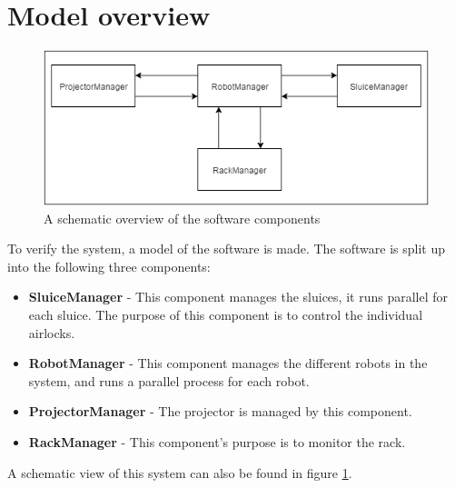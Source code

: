 \documentclass[12pt]{report}
\begin{document}
	\section{Model overview}
	\begin{figure}
		\centering
		\includegraphics[scale=0.7]{schematicoverview}
		\caption{A schematic overview of the software components}
		\label{fig:components}
	\end{figure}
	To verify the system, a model of the software is made. The software is split up into the following three components:
	\begin{itemize}
	\item \textbf{SluiceManager} - This component manages the sluices, it runs parallel for each sluice. The purpose of this component is to control the individual airlocks.
	\item \textbf{RobotManager} - This component manages the different robots in the system, and runs a parallel process for each robot.
	\item \textbf{ProjectorManager} - The projector is managed by this component.
	\item \textbf{RackManager} - This component's purpose is to monitor the rack.
	\end{itemize}
	
	A schematic view of this system can also be found in figure \ref{fig:components}.
	
\end{document}
